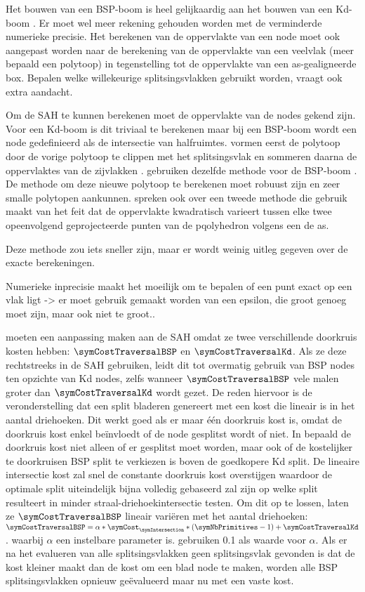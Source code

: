 Het bouwen van een BSP-boom is heel gelijkaardig aan het bouwen van een Kd-boom \cite{Ize}. 
Er moet wel meer rekening gehouden worden met de verminderde numerieke precisie. 
Het berekenen van de oppervlakte van een node moet ook aangepast worden naar de berekening van de oppervlakte van een veelvlak (meer bepaald een polytoop) in tegenstelling tot de oppervlakte van een as-gealigneerde box.
Bepalen welke willekeurige splitsingsvlakken gebruikt worden, vraagt ook extra aandacht.

Om de SAH te kunnen berekenen moet de oppervlakte van de nodes gekend zijn. 
Voor een Kd-boom is dit triviaal te berekenen maar bij een BSP-boom wordt een node gedefinieerd als de intersectie van halfruimtes.
\authorKammaje{ }vormen eerst de polytoop door de vorige polytoop te clippen met het splitsingsvlak en sommeren daarna de oppervlaktes van de zijvlakken \cite{Kammaje}.
\authorIze{ }gebruiken dezelfde methode voor de BSP-boom \cite{Ize}.
De methode om deze nieuwe polytoop te berekenen moet robuust zijn en zeer smalle polytopen aankunnen.
\authorKammaje{ }spreken ook over een tweede methode die gebruik maakt van het feit dat de oppervlakte kwadratisch varieert tussen elke twee opeenvolgend geprojecteerde punten van de pqolyhedron volgens een de as. 

Deze methode zou iets sneller zijn, maar er wordt weinig uitleg gegeven over de exacte berekeningen.

Numerieke inprecisie maakt het moeilijk om te bepalen of een punt exact op een vlak ligt -> er moet gebruik gemaakt worden van een epsilon, die groot genoeg moet zijn, maar ook niet te groot.\cite{Ize}.  

\authorIze{ }moeten een aanpassing maken aan de SAH omdat ze twee verschillende doorkruis kosten hebben: $\symCostTraversalBSP$ en $\symCostTraversalKd$.
Als ze deze rechtstreeks in de SAH gebruiken, leidt dit tot overmatig gebruik van BSP nodes ten opzichte van Kd nodes, zelfs wanneer $\symCostTraversalBSP$ vele malen groter dan $\symCostTraversalKd$ wordt gezet.
De reden hiervoor is de veronderstelling dat een split bladeren genereert met een kost die lineair is in het aantal driehoeken.
Dit werkt goed als er maar één doorkruis kost is, omdat de doorkruis kost enkel beïnvloedt of de node gesplitst wordt of niet.
In \cite{Ize} bepaald de doorkruis kost niet alleen of er gesplitst moet worden, maar ook of de kostelijker te doorkruisen BSP split te verkiezen is boven de goedkopere Kd split.
De lineaire intersectie kost zal snel de constante doorkruis kost overstijgen waardoor de optimale split uiteindelijk bijna volledig gebaseerd zal zijn op welke split resulteert in minder straal-driehoekintersectie testen.
Om dit op te lossen, laten ze $\symCostTraversalBSP$ lineair variëren met het aantal driehoeken: $\symCostTraversalBSP = \alpha * \symCost_\symIntersection * (\symNbPrimitives - 1) + \symCostTraversalKd$. waarbij $\alpha$ een instelbare parameter is. \authorIze{ }gebruiken 0.1 als waarde voor $\alpha$.
Als er na het evalueren van alle splitsingsvlakken geen splitsingsvlak gevonden is dat de kost kleiner maakt dan de kost om een blad node te maken, worden alle BSP splitsingsvlakken opnieuw geëvalueerd maar nu met een vaste kost.

